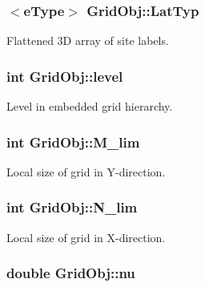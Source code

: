 \subsubsection[{\texorpdfstring{Lat\+Typ}{LatTyp}}]{$<${\bf e\+Type}$>$ Grid\+Obj\+::\+Lat\+Typ}\hypertarget{class_grid_obj_a8ce077fba648f767361039eb924c45ae}{}\label{class_grid_obj_a8ce077fba648f767361039eb924c45ae}


Flattened 3D array of site labels. 

\subsubsection[{\texorpdfstring{level}{level}}]{\setlength{\rightskip}{0pt plus 5cm}int Grid\+Obj\+::level}\hypertarget{class_grid_obj_a7dfedc4442a386ec15c8b03ca899c1a9}{}\label{class_grid_obj_a7dfedc4442a386ec15c8b03ca899c1a9}


Level in embedded grid hierarchy. 

\subsubsection[{\texorpdfstring{M\+\_\+lim}{M_lim}}]{\setlength{\rightskip}{0pt plus 5cm}int Grid\+Obj\+::\+M\+\_\+lim}\hypertarget{class_grid_obj_a01d3f362634c896ecdb80f0e6304c12f}{}\label{class_grid_obj_a01d3f362634c896ecdb80f0e6304c12f}


Local size of grid in Y-\/direction. 

\subsubsection[{\texorpdfstring{N\+\_\+lim}{N_lim}}]{\setlength{\rightskip}{0pt plus 5cm}int Grid\+Obj\+::\+N\+\_\+lim}\hypertarget{class_grid_obj_a5eb35752a7c0741510975d9ee6aa3ce1}{}\label{class_grid_obj_a5eb35752a7c0741510975d9ee6aa3ce1}


Local size of grid in X-\/direction. 

\subsubsection[{\texorpdfstring{nu}{nu}}]{\setlength{\rightskip}{0pt plus 5cm}double Grid\+Obj\+::nu}\hypertarget{class_grid_obj_a755f85eb5480d959211e00937a478ae9}{}\label{class_grid_obj_a755f85eb5480d959211e00937a478ae9}


